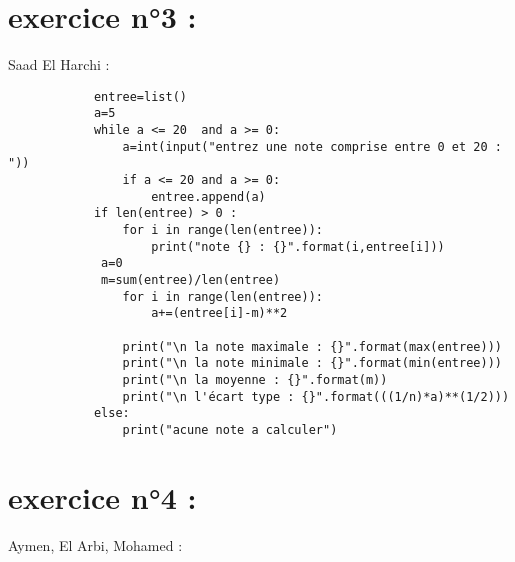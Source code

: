 \documentclass{article}
\begin{document}
\section{exercice n°3 :}
        \begin{center}
    		Saad El Harchi :
	\end{center}    	  
        	
    	\begin{verbatim}
			entree=list()
			a=5
			while a <= 20  and a >= 0:
    			a=int(input("entrez une note comprise entre 0 et 20 : "))
    			if a <= 20 and a >= 0:
        			entree.append(a) 
			if len(entree) > 0 :
    			for i in range(len(entree)):
        			print("note {} : {}".format(i,entree[i]))
   			 a=0
   			 m=sum(entree)/len(entree)
    			for i in range(len(entree)):
        			a+=(entree[i]-m)**2
    
    			print("\n la note maximale : {}".format(max(entree)))
    			print("\n la note minimale : {}".format(min(entree)))
    			print("\n la moyenne : {}".format(m))
    			print("\n l'écart type : {}".format(((1/n)*a)**(1/2)))
			else:
    			print("acune note a calculer")
		\end{verbatim}

\section{exercice n°4 :}
	\begin{center}
    		Aymen, El Arbi, Mohamed :
	\end{center}
	\begin{verbatim}
		
	\end{verbatim}
\end{document}
